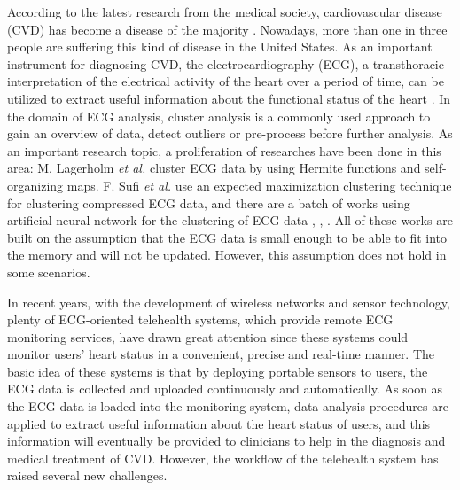 \documentclass[conference]{IEEEtran}
\begin{document}
According to the latest research from the medical society, cardiovascular disease (CVD) has become a disease of the majority \cite{Roger15122011}. Nowadays, more than one in three people are suffering this kind of disease in the United States. As an important instrument for diagnosing CVD, the electrocardiography (ECG), a transthoracic interpretation of the electrical activity of the heart over a period of time, can be utilized to extract useful information about the functional status of the heart \cite{springerlink:10.1007/978-3-642-15020-3_21}. In the domain of ECG analysis, cluster analysis is a commonly used approach to gain an overview of data, detect outliers or pre-process before further analysis. As an important research topic, a proliferation of researches have been done in this area: M. Lagerholm \textit{et al.} \cite{lagerholm2000clustering} cluster ECG data by using Hermite functions and self-organizing maps. F. Sufi \textit{et al.} \cite{sufi2011clustering} use an expected maximization clustering technique 
for clustering compressed ECG data, and there are a batch of works using artificial neural network for the clustering of ECG data \cite{ceylan2009novel}, \cite{bortolan1991ecg}, \cite{bortolan1993diagnostic}. All of these works are built on the assumption that the ECG data is small enough to be able to fit into the memory and will not be updated. However, this assumption does not hold in some scenarios.


In recent years, with the development of wireless networks and sensor technology, plenty of ECG-oriented telehealth systems, which provide remote ECG monitoring services, have drawn great attention since these systems could monitor users' heart status in a convenient, precise and real-time manner. The basic idea of these systems is that by deploying portable sensors to users, the ECG data is collected and uploaded continuously and automatically. As soon as the ECG data is loaded into the monitoring system, data analysis procedures are applied to extract useful information about the heart status of users, and this information will eventually be provided to clinicians to help in the diagnosis and medical treatment of CVD. However, the workflow of the telehealth system has raised several new challenges.
\end{document}
